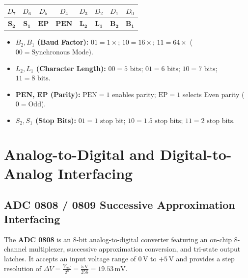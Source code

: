 \documentclass[12pt,a4paper]{article}
\begin{document}
\begin{tcolorbox}[formulabox, title={8251A Mode Instruction Word (Asynchronous)}]
\centering
\begin{tabular}{|c|c|c|c|c|c|c|c|}
\hline
\textbf{$D_7$} & \textbf{$D_6$} & \textbf{$D_5$} & \textbf{$D_4$} & \textbf{$D_3$} & \textbf{$D_2$} & \textbf{$D_1$} & \textbf{$D_0$} \\ \hline
$\mathbf{S_2}$ & $\mathbf{S_1}$ & $\mathbf{EP}$ & $\mathbf{PEN}$ & $\mathbf{L_2}$ & $\mathbf{L_1}$ & $\mathbf{B_2}$ & $\mathbf{B_1}$ \\ \hline
\end{tabular}
\par\vspace{3pt}\raggedright
\begin{itemize}[leftmargin=*, itemsep=1pt]
  \item \textbf{$B_2, B_1$ (Baud Factor):} $01 = 1\times$; $10 = 16\times$; $11 = 64\times$ ($00 = \text{Synchronous Mode}$).
  \item \textbf{$L_2, L_1$ (Character Length):} $00 = 5\text{ bits}$; $01 = 6\text{ bits}$; $10 = 7\text{ bits}$; $11 = 8\text{ bits}$.
  \item \textbf{PEN, EP (Parity):} $\mathrm{PEN}=1$ enables parity; $\mathrm{EP}=1$ selects Even parity ($0 = \text{Odd}$).
  \item \textbf{$S_2, S_1$ (Stop Bits):} $01 = 1\text{ stop bit}$; $10 = 1.5\text{ stop bits}$; $11 = 2\text{ stop bits}$.
\end{itemize}
\end{tcolorbox}

\section{Analog-to-Digital and Digital-to-Analog Interfacing}

\subsection{ADC 0808 / 0809 Successive Approximation Interfacing}
\begin{tcolorbox}[defbox, title={ADC 0808 / 0809 Specifications}]
The \textbf{ADC 0808} is an 8-bit analog-to-digital converter featuring an on-chip 8-channel multiplexer, successive approximation conversion, and tri-state output latches. It accepts an input voltage range of $0\,\mathrm{V}$ to $+5\,\mathrm{V}$ and provides a step resolution of $\Delta V = \frac{V_{ref}}{2^8} = \frac{5\,\mathrm{V}}{256} = 19.53\,\mathrm{mV}$.
\end{tcolorbox}
\end{document}
